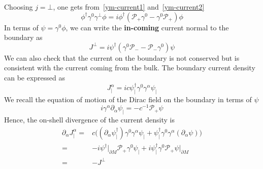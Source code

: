 \begin{remark}
Choosing $j = \bot$, one gets from~\cref{ym-current1} and~\cref{ym-current2}
\begin{equation}\label{ym-current3}
\phi^\dagger\gamma^0\gamma^\bot\phi = i\phi^\dagger(\mathcal{P}_+\gamma^0 - \gamma^0\mathcal{P}_+)\phi  
\end{equation}
In terms of $\psi = \gamma^0\phi$, we can write the \textbf{in-coming} current normal to the boundary as
\begin{equation}\label{ym-current3}
J^\bot = i\psi^\dagger(\gamma^0\mathcal{P}_- - \mathcal{P}_-\gamma^0 )\psi
\end{equation}
We can also check that the current on the boundary is not conserved but is consistent with the current coming from the bulk. 
The boundary current density can be expressed as
\begin{equation*}
J_|^\alpha = i c \psi^\dagger_|\gamma^0\gamma^\alpha\psi_|
\end{equation*}
We recall the equation of motion of the Dirac field on the boundary in terms of $\psi$
\begin{equation*}
i\gamma^\alpha\partial_\alpha\psi_| = -c^{-1}\mathcal{P}_+\psi
\end{equation*}
Hence, the on-shell divergence of the current density is
\begin{equation*}
\begin{split}
\partial_\alpha J_|^\alpha  = & c\big((\partial_\alpha\psi_|^\dagger)\gamma^0\gamma^\alpha\psi_| + \psi_|^\dagger\gamma^0\gamma^\alpha(\partial_\alpha\psi) \big)\\
= &
-i\psi^\dagger\vert_{\partial M}\mathcal{P}_+ \gamma^0\psi_| + i\psi_|^\dagger\gamma^0 \mathcal{P}_+\psi\vert_{\partial M} \\
= & -J^\bot
\end{split}
\end{equation*}
\end{remark}
